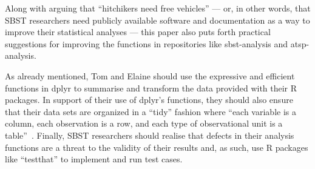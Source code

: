 



Along with arguing that ``hitchikers need free vehicles'' --- or, in other words, that SBST researchers need publicly
available software and documentation as a way to improve their statistical analyses --- this paper also puts forth
practical suggestions for improving the functions in repositories like sbst-analysis and atsp-analysis.


As already mentioned, Tom and Elaine should use the expressive and efficient functions in dplyr to summarise and
transform the data provided with their R packages. In support of their use of dplyr's functions, they should also ensure
that their data sets are organized in a ``tidy'' fashion where ``each variable is a column, each observation is a row,
and each type of observational unit is a table''~\cite{Wickham2014}.  Finally, SBST researchers should realise that
defects in their analysis functions are a threat to the validity of their results and, as such, use R packages
like ``testthat'' to implement and run test cases.



